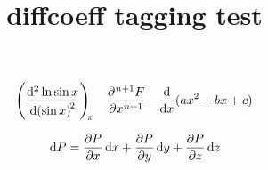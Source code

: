 \documentclass{article}
\title{diffcoeff tagging test}
\begin{document}
\[ \diff[2]{\ln\sin x}{\sin x}[\pi] \quad
   \diffp[n+1]{F}{x}                \quad
   \diff*{(ax^2+bx+c)}{x}           \]

\[ \dl P = \diffp Px \dl x + \diffp Py \dl y
           + \diffp Pz \dl z                  \]
\end{document}
